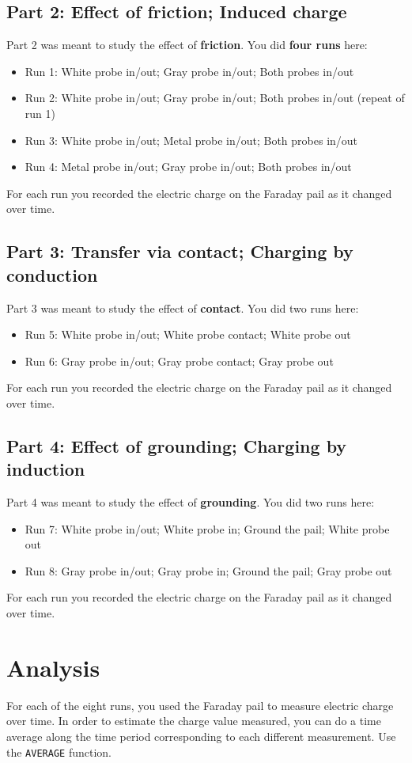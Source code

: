 \subsection{Part 2: Effect of friction; Induced charge}
%
Part 2 was meant to study the effect of \textbf{friction}. You did \textbf{four runs} here:
\begin{itemize}
	\item Run 1: White probe in/out; Gray probe in/out; Both probes in/out
	\item Run 2: White probe in/out; Gray probe in/out; Both probes in/out (repeat of run 1)
	\item Run 3: White probe in/out; Metal probe in/out; Both probes in/out
	\item Run 4: Metal probe in/out; Gray probe in/out; Both probes in/out
\end{itemize}
For each run you recorded the electric charge on the Faraday pail as it changed over time.
%
\subsection{Part 3: Transfer via contact; Charging by conduction}
%
Part 3 was meant to study the effect of \textbf{contact}. You did two runs here:
\begin{itemize}
	\item Run 5: White probe in/out; White probe contact; White probe out
	\item Run 6: Gray probe in/out; Gray probe contact; Gray probe out
\end{itemize}
For each run you recorded the electric charge on the Faraday pail as it changed over time.
%
\subsection{Part 4: Effect of grounding; Charging by induction}
%
Part 4 was meant to study the effect of \textbf{grounding}. You did two runs here:
\begin{itemize}
	\item Run 7: White probe in/out; White probe in; Ground the pail; White probe out
	\item Run 8: Gray probe in/out; Gray probe in; Ground the pail; Gray probe out
\end{itemize}
For each run you recorded the electric charge on the Faraday pail as it changed over time.
%
\section{Analysis}
%
For each of the eight runs, you used the Faraday pail to measure electric charge over time. In order to estimate the charge value measured, you can do a time average along the time period corresponding to each different measurement. Use the \texttt{AVERAGE} function.
%
